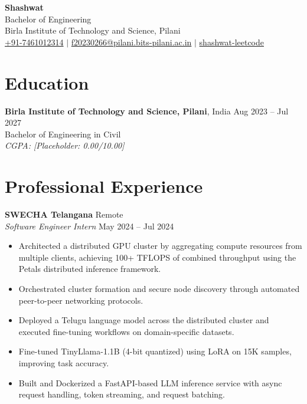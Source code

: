 \documentclass[11pt,a4paper]{article}
\begin{document}
{\LARGE \textbf{Shashwat}}\\[3pt]
Bachelor of Engineering\\
Birla Institute of Technology and Science, Pilani\\
\href{tel:+917461012314}{+91-7461012314} $\vert$ 
\href{mailto:f20230266@pilani.bits-pilani.ac.in}{f20230266@pilani.bits-pilani.ac.in} $\vert$
\href{https://leetcode.com/shashwat-leetcode}{shashwat-leetcode}

\vspace{8pt}

\section*{Education}
\textbf{Birla Institute of Technology and Science, Pilani}, India \hfill Aug 2023 -- Jul 2027\\
Bachelor of Engineering in Civil\\
\textit{CGPA: [Placeholder: 0.00/10.00]}

\section*{Professional Experience}
\textbf{SWECHA Telangana} \hfill Remote\\
\textit{Software Engineer Intern} \hfill May 2024 -- Jul 2024
\begin{itemize}
    \item Architected a distributed GPU cluster by aggregating compute resources from multiple clients, achieving 100+ TFLOPS of combined throughput using the Petals distributed inference framework.
    \item Orchestrated cluster formation and secure node discovery through automated peer-to-peer networking protocols.
    \item Deployed a Telugu language model across the distributed cluster and executed fine-tuning workflows on domain-specific datasets.
    \item Fine-tuned TinyLlama-1.1B (4-bit quantized) using LoRA on 15K samples, improving task accuracy.
    \item Built and Dockerized a FastAPI-based LLM inference service with async request handling, token streaming, and request batching.
\end{itemize}
\end{document}
